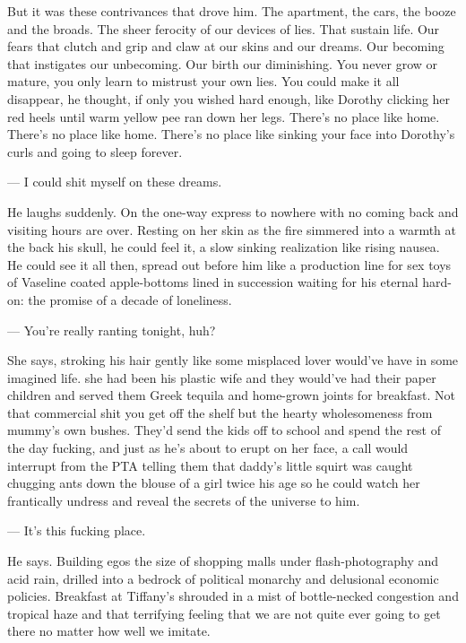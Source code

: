 \documentclass[11pt]{article}
\begin{document}
	But it was these contrivances that drove him. The apartment, the cars, the 
booze and the broads. The sheer ferocity of our devices of lies. That sustain 
life. Our fears that clutch and grip and claw at our skins and our dreams. Our 
becoming that instigates our unbecoming. Our birth our diminishing. You never 
grow or mature, you only learn to mistrust your own lies. You could make it all 
disappear, he thought, if only you wished hard enough, like Dorothy clicking 
her red heels until warm yellow pee ran down her legs. There's no place like 
home. There's no place like home. There's no place like sinking your face into 
Dorothy's curls and going to sleep forever.

	--- I could shit myself on these dreams.

	He laughs suddenly. On the one-way express to nowhere with no coming back 
and visiting hours are over. Resting on her skin as the fire simmered into a 
warmth at the back his skull, he could feel it, a slow sinking realization like 
rising nausea. He could see it all then, spread out before him like a 
production line for sex toys of Vaseline coated apple-bottoms lined in 
succession waiting for his eternal hard-on: the promise of a decade of 
loneliness.

	--- You're really ranting tonight, huh?

	She says, stroking his hair gently like some misplaced lover would've have 
in some imagined life. she had been his plastic wife and they would've had 
their paper children and served them Greek tequila and home-grown joints for 
breakfast. Not that commercial shit you get off the shelf but the hearty 
wholesomeness from mummy's own bushes. They'd send the kids off to school and 
spend the rest of the day fucking, and just as he's about to erupt on her face, 
a call would interrupt from the PTA telling them that daddy's little squirt was 
caught chugging ants down the blouse of a girl twice his age so he could watch 
her frantically undress and reveal the secrets of the universe to him.
	
	--- It's this fucking place.
	
	He says. Building egos the size of shopping malls under flash-photography 
and acid rain, drilled into a bedrock of political monarchy and delusional 
economic policies. Breakfast at Tiffany's shrouded in a mist of bottle-necked 
congestion and tropical haze and that terrifying feeling that we are not quite 
ever going to get there no matter how well we imitate.
\end{document}
